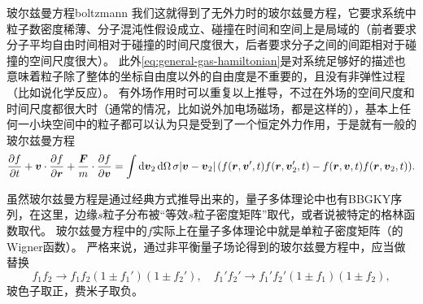 \begin{back}{玻尔兹曼方程}{boltzmann}
    我们这就得到了无外力时的玻尔兹曼方程，它要求系统中粒子数密度稀薄、分子混沌性假设成立、碰撞在时间和空间上是局域的（前者要求分子平均自由时间相对于碰撞的时间尺度很大，后者要求分子之间的间距相对于碰撞的空间尺度很大）。
    此外\eqref{eq:general-gas-hamiltonian}是对系统足够好的描述也意味着粒子除了整体的坐标自由度以外的自由度是不重要的，且没有非弹性过程（比如说化学反应）。
    有外场作用时可以重复以上推导，不过在外场的空间尺度和时间尺度都很大时（通常的情况，比如说外加电场磁场，都是这样的），基本上任何一小块空间中的粒子都可以认为只是受到了一个恒定外力作用，于是就有一般的玻尔兹曼方程
    \begin{equation}
        \pdv{f}{t} + \vb*{v} \cdot \pdv{f}{\vb*{r}} + \frac{\vb*{F}}{m} \cdot \pdv{f}{\vb*{v}} = \int \dd{\vb*{v}_2} \dd{\Omega} \sigma \abs*{\vb*{v}-\vb*{v}_2} (f(\vb*{r}, \vb*{v}', t) f(\vb*{r}, \vb*{v}'_{2}, t) - f(\vb*{r}, \vb*{v}, t) f(\vb*{r}, \vb*{v}_{2}, t)).
        \label{eq:boltzmann-eq-with-force}
    \end{equation}

    虽然玻尔兹曼方程是通过经典方式推导出来的，量子多体理论中也有BBGKY序列，在这里，边缘$s$粒子分布被“等效$s$粒子密度矩阵”取代，或者说被特定的格林函数取代。
    玻尔兹曼方程中的$f$实际上在量子多体理论中就是单粒子密度矩阵（的Wigner函数）。
    严格来说，通过非平衡量子场论得到的玻尔兹曼方程中，应当做替换
    \begin{equation}
        f_1 f_2 \longrightarrow f_1 f_2 (1 \pm f_1') (1 \pm f_2'), \quad f_1' f_2' \longrightarrow f_1' f_2' (1 \pm f_1) (1 \pm f_2),
    \end{equation}
    玻色子取正，费米子取负。
\end{back}